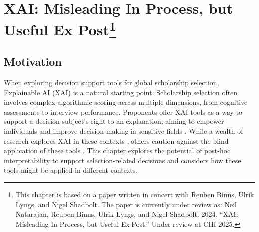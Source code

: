 \chapter[XAI]{\label{ch:xai}XAI: Misleading In Process, but Useful Ex Post\footnote{This chapter is based on a paper written in concert with Reuben Binns, Ulrik Lyngs, and Nigel Shadbolt. The paper is currently under review as: Neil Natarajan, Reuben Binns, Ulrik Lyngs, and Nigel Shadbolt. 2024. ``XAI: Misleading In Process, but Useful Ex Post.'' Under review at CHI 2025.}}

\minitoc


\section{Motivation}
When exploring decision support tools for global scholarship selection, Explainable AI (XAI) is a natural starting point. Scholarship selection often involves complex algorithmic scoring across multiple dimensions, from cognitive assessments to interview performance. Proponents offer XAI tools as a way to support a decision-subject's right to an explanation, aiming to empower individuals and improve decision-making in sensitive fields \cite{Goodman_Flaxman_2017}. While a wealth of research explores XAI in these contexts \cite{molnar_interpretable_2019,wachter_counterfactual_2017,Barocas_Hood_Ziewitz_2013}, others caution against the blind application of these tools \cite{kumar_problems_2020,Bastounis_Campodonico_vanderSchaar_Adcock_Hansen_2024}. This chapter explores the potential of post-hoc interpretability to support selection-related decisions and considers how these tools might be applied in different contexts.

